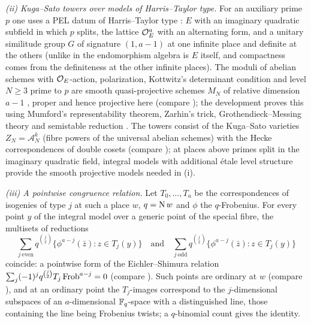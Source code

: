 \begin{proofoutline}
\emph{(ii) Kuga--Sato towers over models of Harris--Taylor type.} For an auxiliary prime $p$ one uses a
PEL datum of Harris--Taylor type \cite{Kottwitz1992,HarrisTaylor2001}: $E$ with an imaginary quadratic
subfield in which $p$ splits, the lattice $\mathcal{O}_E^a$ with an alternating form, and a unitary similitude
group $G$ of signature $(1,a-1)$ at one infinite place and definite at the others (unlike in
\cite{HarrisTaylor2001} the endomorphism algebra is $E$ itself, and compactness comes from the
definiteness at the other infinite places). The moduli of abelian schemes with $\mathcal{O}_E$-action,
polarization, Kottwitz's determinant condition and level $N\ge3$ prime to $p$ are smooth
quasi-projective schemes $M_N$ of relative dimension $a-1$ \cite{Kottwitz1992}, proper and hence
projective here (compare \cite{Lan2013}); the development proves this using Mumford's
representability theorem, Zarhin's trick, Grothendieck--Messing theory and semistable reduction
\cite{MumfordFogartyKirwan1994,Zarhin1977,Messing1972,Grothendieck1972}. The towers consist of the
Kuga--Sato varieties $Z_N=\mathcal A_N^k$ (fibre powers of the universal abelian schemes) with the Hecke
correspondences of double cosets (compare \cite{Deligne1971,Scholl1990}); at places above primes split
in the imaginary quadratic field, integral models with additional \'etale level structure provide the
smooth projective models needed in (i).

\emph{(iii) A pointwise congruence relation.} Let $T_0,\dots,T_a$ be the correspondences of isogenies
of type $j$ at such a place $w$, $q=\operatorname{N} w$ and $\phi$ the $q$-Frobenius. For every point $y$ of the
integral model over a generic point of the special fibre, the multisets of reductions
\[
  \sum_{j\ \mathrm{even}}q^{\binom j2}\bigl\{\phi^{a-j}(\bar z):z\in T_j(y)\bigr\}
  \quad\text{and}\quad
  \sum_{j\ \mathrm{odd}}q^{\binom j2}\bigl\{\phi^{a-j}(\bar z):z\in T_j(y)\bigr\}
\]
coincide: a pointwise form of the Eichler--Shimura relation $\sum_j(-1)^jq^{\binom j2}T_j\operatorname{Frob}^{a-j}=0$
(compare \cite{Wedhorn2000}). Such points are ordinary at $w$ (compare \cite{Wedhorn1999}), and at an
ordinary point the $T_j$-images correspond to the $j$-dimensional subspaces of an $a$-dimensional
$\mathbb{F}_q$-space with a distinguished line, those containing the line being Frobenius twists; a
$q$-binomial count gives the identity.


\end{proofoutline}
